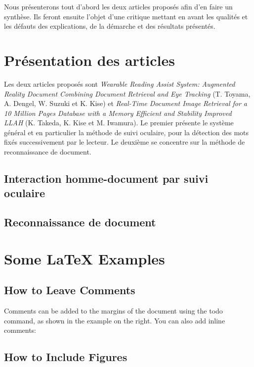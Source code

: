 \documentclass[a4paper]{article}
\begin{document}
Nous présenterons tout d'abord les deux articles proposés afin d'en faire un synthèse. Ils feront ensuite l'objet d'une critique mettant en avant les qualités et les défauts des explications, de la démarche et des résultats présentés.

\section{Présentation des articles}

Les deux articles proposés sont \textit{Wearable Reading Assist System: Augmented Reality Document Combining Document Retrieval and Eye Tracking} (T. Toyama, A. Dengel, W. Suzuki et K. Kise) et \textit{Real-Time Document Image Retrieval for a 10 Million Pages Database with a Memory Efficient and Stability Improved LLAH} (K. Takeda, K. Kise et M. Iwamura). Le premier présente le système général et en particulier la méthode de suivi oculaire, pour la détection des mots fixés successivement par le lecteur. Le deuxième se concentre sur la méthode de reconnaissance de document.

\subsection{Interaction homme-document par suivi oculaire}



\subsection{Reconnaissance de document}



\newpage

\section{Some \LaTeX{} Examples}
\label{sec:examples}

\subsection{How to Leave Comments}

Comments can be added to the margins of the document using the  todo command, as shown in the example on the right. You can also add inline comments:


\subsection{How to Include Figures}
\end{document}
